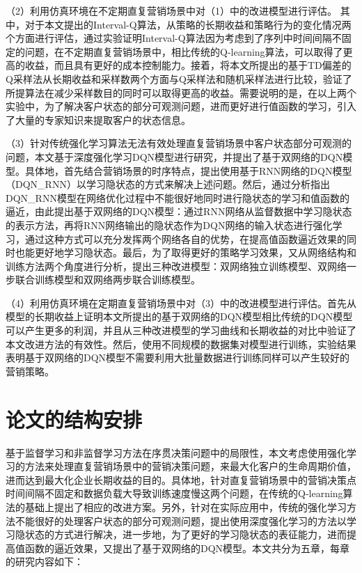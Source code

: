 
（2）利用仿真环境在不定期直复营销场景中对（1）中的改进模型进行评估。
其中，对于本文提出的Interval-Q算法，从策略的长期收益和策略行为的变化情况两个方面进行评估，通过实验证明Interval-Q算法因为考虑到了序列中时间间隔不固定的问题，在不定期直复营销场景中，相比传统的Q-learning算法，可以取得了更高的收益，而且具有更好的成本控制能力。接着，将本文所提出的基于TD偏差的Q采样法从长期收益和采样数两个方面与Q采样法和随机采样法进行比较，验证了所提算法在减少采样数目的同时可以取得更高的收益。需要说明的是，在以上两个实验中，为了解决客户状态的部分可观测问题，进而更好进行值函数的学习，引入了大量的专家知识来提取客户的状态信息。

（3）针对传统强化学习算法无法有效处理直复营销场景中客户状态部分可观测的问题，本文基于深度强化学习DQN模型进行研究，并提出了基于双网络的DQN模型。具体地，首先结合营销场景的时序特点，提出使用基于RNN网络的DQN模型（DQN_RNN）以学习隐状态的方式来解决上述问题。然后，通过分析指出DQN_RNN模型在网络优化过程中不能很好地同时进行隐状态的学习和值函数的逼近，由此提出基于双网络的DQN模型：通过RNN网络从监督数据中学习隐状态的表示方法，再将RNN网络输出的隐状态作为DQN网络的输入状态进行强化学习，通过这种方式可以充分发挥两个网络各自的优势，在提高值函数逼近效果的同时也能更好地学习隐状态。最后，为了取得更好的策略学习效果，又从网络结构和训练方法两个角度进行分析，提出三种改进模型：双网络独立训练模型、双网络一步联合训练模型和双网络两步联合训练模型。

（4）利用仿真环境在定期直复营销场景中对（3）中的改进模型进行评估。首先从模型的长期收益上证明本文所提出的基于双网络的DQN模型相比传统的DQN模型可以产生更多的利润，并且从三种改进模型的学习曲线和长期收益的对比中验证了本文改进方法的有效性。然后，使用不同规模的数据集对模型进行训练，实验结果表明基于双网络的DQN模型不需要利用大批量数据进行训练同样可以产生较好的营销策略。

\section{论文的结构安排}
基于监督学习和非监督学习方法在序贯决策问题中的局限性，本文考虑使用强化学习的方法来处理直复营销场景中的营销决策问题，来最大化客户的生命周期价值，进而达到最大化企业长期收益的目的。具体地，针对直复营销场景中的营销决策点时间间隔不固定和数据负载大导致训练速度慢这两个问题，在传统的Q-learning算法的基础上提出了相应的改进方案。另外，针对在实际应用中，传统的强化学习方法不能很好的处理客户状态的部分可观测问题，提出使用深度强化学习的方法以学习隐状态的方式进行解决，进一步地，为了更好的学习隐状态的表征能力，进而提高值函数的逼近效果，又提出了基于双网络的DQN模型。本文共分为五章，每章的研究内容如下：

